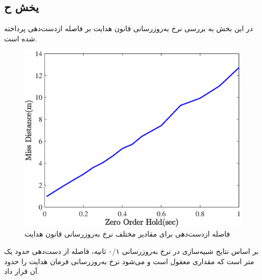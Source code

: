 \subsection{یخش ح}
در این بخش به بررسی نرخ به‌روزرسانی قانون هدایت بر فاصله‌ ازدست‌دهی پرداخته شده است.
\begin{figure}[H]
	\centering
	\includegraphics[width=.75\linewidth]{../Figure/Q1/h/MD}
	\caption{فاصله ازدست‌دهی برای مقادیر مختلف نرخ به‌روزرسانی قانون هدایت}
\end{figure}

بر اساس نتایج شبیه‌سازی در نرخ به‌روزرسانی ۰/۱ ثانیه، فاصله از دست‌دهی حدود یک متر است که مقداری معقول است و می‌شود نرخ به‌روزرسانی فرمان هدایت را حدود آن قرار داد.